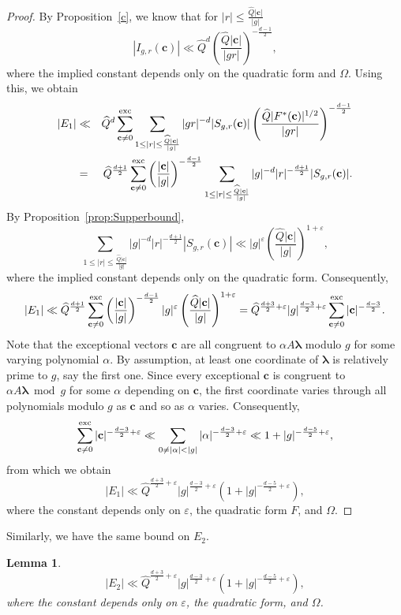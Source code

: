 \documentclass[11pt]{amsart}
\theoremstyle{plain}
\theoremstyle{plain}
\newtheorem{lemma}[theorem]{Lemma}
\renewcommand{\vec}[1]{\mathbf{#1}}
\theoremstyle{remark}
\theoremstyle{definition}
\newcommand{\hQ}{\widehat{Q}}
\newcommand{\exc}{\textup{exc}}
\begin{document}
\begin{proof}
By Proposition~\ref{c}, we know that for $|r|\leq\frac{\hQ|\vec{c}|}{|g|}$
\[|I_{g,r}(\vec{c})|\ll\hQ^d\left(\frac{\hQ|\vec{c}|}{|gr|}\right)^{-\frac{d-1}{2}},\]
where the implied constant depends only on the quadratic form and $\Omega$. Using this, we obtain
\begin{eqnarray*}|E_1|&\ll& \hQ^d\sum_{\vec{c}\neq 0}^{\exc}\sum_{1\leq |r|\leq\frac{\hQ |\vec{c}|}{|g|}}|gr|^{-d}|S_{g,r}(\vec{c})|\left(\frac{\hQ|F^*(\vec{c})|^{1/2}}{|gr|}\right)^{-\frac{d-1}{2}}\\&=&\hQ^{\frac{d+1}{2}}\sum_{\vec{c}\neq 0}^{\exc}\left(\frac{|\vec{c}|}{|g|}\right)^{-\frac{d-1}{2}}\sum_{1\leq |r|\leq\frac{\hQ |\vec{c}|}{|g|}}|g|^{-d}|r|^{-\frac{d+1}{2}}|S_{g,r}(\vec{c})|.
\end{eqnarray*}
By Proposition~\ref{prop:Supperbound},
\[\sum_{1\leq |r|\leq\frac{\hQ |\vec{c}|}{|g|}}|g|^{-d}|r|^{-\frac{d+1}{2}}|S_{g,r}(\vec{c})|\ll|g|^{\varepsilon}\left(\frac{\hQ |\vec{c}|}{|g|}\right)^{1+\varepsilon},\]
where the implied constant depends only on the quadratic form. Consequently,
\[|E_1|\ll \hQ^{\frac{d+1}{2}}\sum_{\vec{c}\neq 0}^{\exc}\left(\frac{|\vec{c}|}{|g|}\right)^{-\frac{d-1}{2}}|g|^{\varepsilon}\left(\frac{\hQ |\vec{c}|}{|g|}\right)^{1+\varepsilon}=\hQ^{\frac{d+3}{2}+\varepsilon}|g|^{\frac{d-3}{2}+\varepsilon}\sum_{\vec{c}\neq 0}^{\exc}|\vec{c}|^{-\frac{d-3}{2}}.\]
Note that the exceptional vectors $\vec{c}$ are all congruent to $\alpha A\boldsymbol{\lambda}$ modulo $g$ for some varying polynomial $\alpha$. By assumption, at least one coordinate of $\boldsymbol{\lambda}$ is relatively prime to $g$, say the first one. Since every exceptional $\vec{c}$ is congruent to $\alpha A\boldsymbol{\lambda}\bmod g$ for some $\alpha$ depending on $\vec{c}$, the first coordinate varies through all polynomials modulo $g$ as $\vec{c}$ and so as $\alpha$ varies. Consequently,
\[\sum_{\vec{c}\neq 0}^{\exc}|\vec{c}|^{-\frac{d-3}{2}+\varepsilon}\ll \sum_{0\neq|\alpha|<|g|}|\alpha|^{-\frac{d-3}{2}+\varepsilon}\ll 1+|g|^{-\frac{d-5}{2}+\varepsilon},\]
from which we obtain
\[|E_1|\ll \hQ^{\frac{d+3}{2}+\varepsilon}|g|^{\frac{d-3}{2}+\varepsilon}(1+|g|^{-\frac{d-5}{2}+\varepsilon}),\]
where the constant depends only on $\varepsilon$, the quadratic form $F$, and $\Omega$.
\end{proof}
Similarly, we have the same bound on $E_2$.
\begin{lemma}\label{lem:e2}
\[|E_2|\ll \hQ^{\frac{d+3}{2}+\varepsilon}|g|^{\frac{d-3}{2}+\varepsilon}(1+|g|^{-\frac{d-5}{2}+\varepsilon}),\]
where the constant depends only on $\varepsilon$, the quadratic form, and $\Omega$.
\end{lemma}
\end{document}
